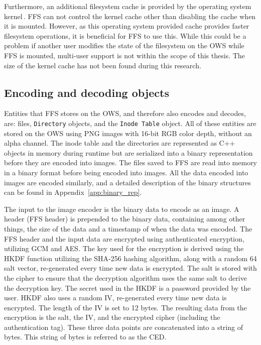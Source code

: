 Furthermore, an additional filesystem cache is provided by the operating system kernel\,\cite{fleischerMountOptionsOsxfuse2020, gowdappaExperiencesFUSEReal2019}. \gls{FFS} can not control the kernel cache other than disabling the cache when it is mounted. However, as this operating system provided cache provides faster filesystem operations, it is beneficial for \gls{FFS} to use this. While this could be a problem if another user modifies the state of the filesystem on the \gls{OWS} while \gls{FFS} is mounted, \mbox{multi-user} support is not within the scope of this thesis. The size of the kernel cache has not been found during this research.

\subsection{Encoding and decoding objects}
\label{subsec:file_enc_dec}
Entities that \gls{FFS} stores on the \gls{OWS}, and therefore also encodes and decodes, are: files, \texttt{Directory} objects, and the \texttt{Inode Table} object. All of these entities are stored on the \gls{OWS} using PNG images with \mbox{16-bit} \gls{RGB} color depth, without an alpha channel. The inode table and the directories are represented as C++ objects in memory during runtime but are serialized into a binary representation before they are encoded into images. The files saved to \gls{FFS} are read into memory in a binary format before being encoded into images. All the data encoded into images are encoded similarly, and a detailed description of the binary structures can be found in Appendix~\ref{app:binary_rep}. 

The input to the image encoder is the binary data to encode as an image. A header (\gls{FFS} header) is prepended to the binary data, containing among other things, the size of the data and a timestamp of when the data was encoded. The \gls{FFS} header and the input data are encrypted using authenticated encryption, utilizing \gls{GCM} and \gls{AES}. The key used for the encryption is derived using the \gls{HKDF} function utilizing the \gls{SHA}-256 hashing algorithm, along with a random \SI{64}{\byte} salt vector, \mbox{re-generated} every time new data is encrypted. The salt is stored with the cipher to ensure that the decryption algorithm uses the same salt to derive the decryption key. The secret used in the \gls{HKDF} is a password provided by the user. \gls{HKDF} also uses a random \gls{IV}, \mbox{re-generated} every time new data is encrypted. The length of the \gls{IV} is set to 12 bytes. The resulting data from the encryption is the salt, the \gls{IV}, and the encrypted cipher (including the authentication tag). These three data points are concatenated into a string of bytes. This string of bytes is referred to as the \gls{CED}.

